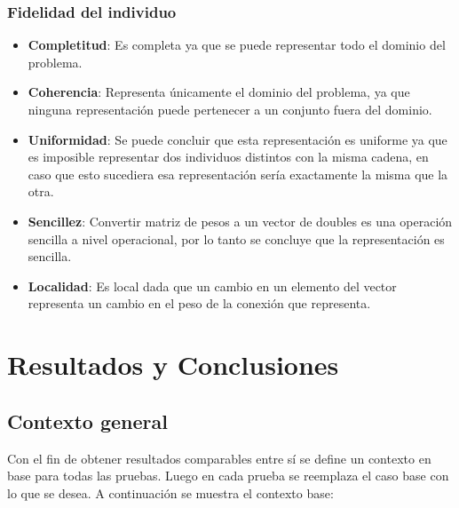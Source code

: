 \documentclass{sig-alternate}
\begin{document}
	\subsubsection{Fidelidad del individuo}

	\begin{itemize}

		\item \textbf{Completitud}: Es completa ya que se puede representar todo el dominio del problema.

		\item \textbf{Coherencia}: Representa únicamente el dominio del problema, ya que ninguna representación puede pertenecer a un conjunto fuera del dominio.

		\item \textbf{Uniformidad}: Se puede concluir que esta representación es uniforme ya que es imposible representar dos individuos distintos con la misma cadena, en caso que esto sucediera esa representación sería exactamente la misma que la otra.	

		\item \textbf{Sencillez}: Convertir matriz de pesos a un vector de doubles es una operación sencilla a nivel operacional, por lo tanto se concluye que la representación es sencilla.

		\item \textbf{Localidad}: Es local dada que un cambio en un elemento del vector representa un cambio en el peso de la conexión que representa.

	\end{itemize}
	
\section{Resultados y Conclusiones}

	\subsection{Contexto general}

	Con el fin de obtener resultados comparables entre sí se define un contexto en base para todas las pruebas. Luego en cada prueba se reemplaza el caso base con lo que se desea. A continuación se muestra el contexto base:
\end{document}
